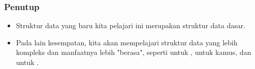 \begin{frame}
\frametitle{Penutup}
\begin{itemize}
  \item Struktur data yang baru kita pelajari ini merupakan struktur data dasar.
  \item Pada lain kesempatan, kita akan mempelajari struktur data yang lebih kompleks dan manfaatnya lebih "berasa", seperti  untuk ,  untuk kamus, dan  untuk .
\end{itemize}
\end{frame}




